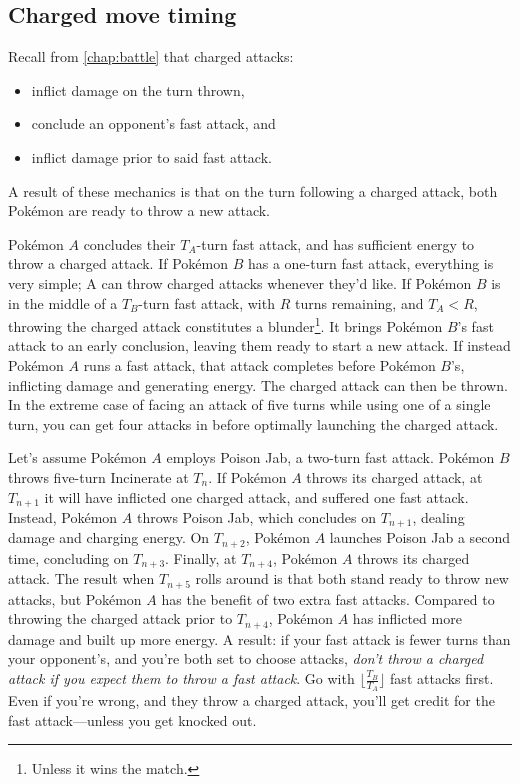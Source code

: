 \subsection{Charged move timing\label{subsec:cmt}}
Recall from \autoref{chap:battle} that charged attacks:
\begin{itemize}
\item inflict damage on the turn thrown,
\item conclude an opponent's fast attack, and
\item inflict damage prior to said fast attack.
\end{itemize}
A result of these mechanics is that on the turn following a charged attack,
 both Pokémon are ready to throw a new attack.

Pokémon $A$ concludes their $T_A$-turn fast attack, and has sufficient energy to throw a charged attack.
If Pokémon $B$ has a one-turn fast attack, everything is very simple;
 A can throw charged attacks whenever they'd like.
If Pokémon $B$ is in the middle of a $T_B$-turn fast attack, with $R$ turns remaining,
 and $T_A < R$, throwing the charged attack constitutes a blunder\footnote{Unless it wins the match.}.
It brings Pokémon $B$'s fast attack to an early conclusion, leaving them ready to start a new attack.
If instead Pokémon $A$ runs a fast attack, that attack completes before Pokémon $B$'s, inflicting damage and generating energy.
The charged attack can then be thrown.
In the extreme case of facing an attack of five turns while using one of a single turn,
  you can get four attacks in before optimally launching the charged attack.

Let's assume Pokémon $A$ employs Poison Jab, a two-turn fast attack.
Pokémon $B$ throws five-turn Incinerate at $T_n$.
If Pokémon $A$ throws its charged attack, at $T_{n+1}$ it will have inflicted
  one charged attack, and suffered one fast attack.
Instead, Pokémon $A$ throws Poison Jab, which concludes on $T_{n+1}$, dealing damage and charging energy.
On $T_{n+2}$, Pokémon $A$ launches Poison Jab a second time, concluding on $T_{n+3}$.
Finally, at $T_{n+4}$, Pokémon $A$ throws its charged attack.
The result when $T_{n+5}$ rolls around is that both stand ready to throw new attacks,
  but Pokémon $A$ has the benefit of two extra fast attacks.
Compared to throwing the charged attack prior to $T_{n+4}$,
  Pokémon $A$ has inflicted more damage and built up more energy.
A result: if your fast attack is fewer turns than your opponent's,
 and you're both set to choose attacks,
 \textit{don't throw a charged attack if you expect them to throw a fast attack}.
Go with $\lfloor\frac{T_B}{T_A}\rfloor$ fast attacks first.
Even if you're wrong, and they throw a charged attack, you'll get credit for the fast attack---unless you get knocked out.

